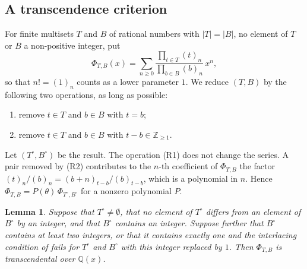 \documentclass[11pt]{amsart}
\newtheorem{lemma}[theorem]{Lemma}
\theoremstyle{definition}
\theoremstyle{remark}
\numberwithin{equation}{section}
\newcommand{\Q}{\mathbb{Q}}
\newcommand{\Z}{\mathbb{Z}}
\begin{document}
\subsection*{A transcendence criterion}
For finite multisets $T$ and $B$ of rational numbers with $|T|=|B|$, no element of $T$ or $B$ a non-positive integer, put
\[
\Phi_{T,B}(x)=\sum_{n\ge0}\frac{\prod_{t\in T}(t)_n}{\prod_{b\in B}(b)_n}\,x^n ,
\]
so that $n!=(1)_n$ counts as a lower parameter $1$. We reduce $(T,B)$ by the following two operations, as long as possible:
\begin{enumerate}[label=(R\arabic*),leftmargin=3em]
\item remove $t\in T$ and $b\in B$ with $t=b$;
\item remove $t\in T$ and $b\in B$ with $t-b\in\Z_{\ge1}$.
\end{enumerate}
Let $(T^\circ,B^\circ)$ be the result. The operation (R1) does not change the series. A pair removed by (R2) contributes to the $n$-th coefficient of $\Phi_{T,B}$ the factor $(t)_n/(b)_n=(b+n)_{t-b}/(b)_{t-b}$, which is a polynomial in $n$. Hence $\Phi_{T,B}=P(\theta)\,\Phi_{T^\circ,B^\circ}$ for a nonzero polynomial $P$.

\begin{lemma}\label{lem:C1}
Suppose that $T^\circ\ne\emptyset$, that no element of $T^\circ$ differs from an element of $B^\circ$ by an integer, and that $B^\circ$ contains an integer. Suppose further that $B^\circ$ contains at least two integers, or that it contains exactly one and the interlacing condition of \citet[Theorem~4.8]{BeukersHeckman1989} fails for $T^\circ$ and $B^\circ$ with this integer replaced by $1$. Then $\Phi_{T,B}$ is transcendental over $\Q(x)$.
\end{lemma}
\end{document}
